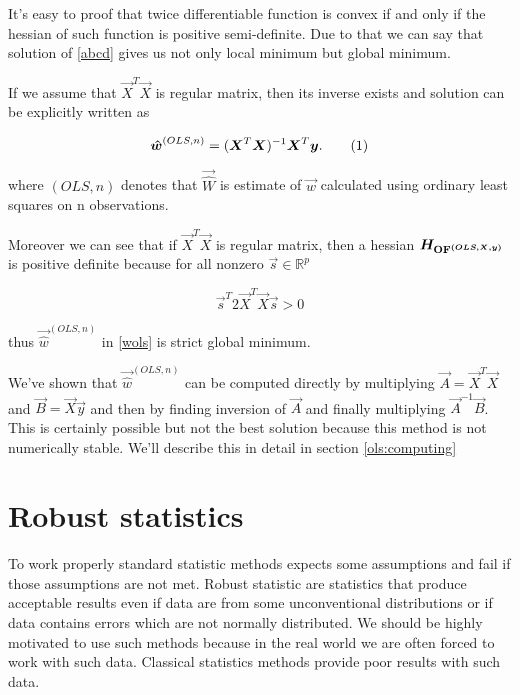 It's easy to proof that twice differentiable function is convex if and only if the hessian of such function is positive semi-definite. Due to that we can say that solution of \eqref{abcd} gives us not only local minimum but global minimum. 

If we assume that $\vec{X}^T\vec{X}$ is regular matrix, then its inverse exists and solution can be explicitly written as


\begin{equation}
    \vec{\hat{w}}^{(OLS,n)} = (\vec{X}^T\vec{X})^{-1}\vec{X}^T\vec{y}. \numberthis \label{wols}
\end{equation}

where $(OLS,n)$ denotes that $\vec{\hat{W}}$ is estimate of $\vec{w}$ calculated using ordinary least squares on n observations. 

Moreover we can see that if $\vec{X}^T\vec{X}$ is regular matrix, then a hessian $\boldsymbol{H_{\operatorname{OF}^{(OLS,\boldsymbol{X}, \boldsymbol{y})}}}$ is positive definite because for all nonzero $\vec{s} \in \mathbb{R}^p$


\begin{equation}
    \vec{s}^T 2\vec{X}^T\vec{X} \vec{s} > 0
\end{equation}

thus $\vec{\hat{w}}^{(OLS,n)}$ in \eqref{wols} is strict global minimum.



We've shown that $\vec{\hat{w}}^{(OLS,n)}$ can be computed directly by multiplying $\vec{A} = \vec{X}^T\vec{X}$ and $\vec{B} = \vec{X}\vec{y}$ and then by finding inversion of $\vec{A}$  and finally multiplying $\vec{A}^{-1}\vec{B}$. This is certainly possible but not the best solution because this method is not numerically stable. We'll describe this in detail in section \ref{ols:computing}

\section{Robust statistics} \label{section:roboust}
To work properly standard statistic methods expects some assumptions and fail if those assumptions are not met. Robust statistic are statistics that produce acceptable results even if data are from some unconventional distributions or if data contains errors which are not normally distributed. We should be highly motivated to use such methods because in the real world we are often forced to work with such data. Classical statistics methods provide poor results with such data. 

